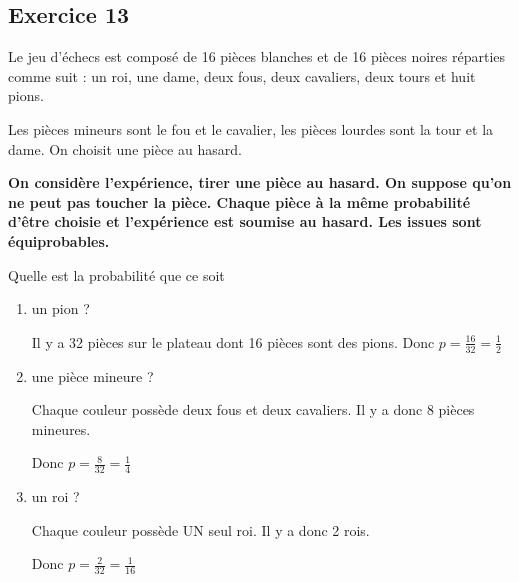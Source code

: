 \documentclass[openany]{book}
\begin{document}
\newpage

\begin{minipage}{0.5\linewidth}
 
\subsection{Exercice 13}
 
Le jeu d'échecs est composé de 16 pièces blanches et de 16 pièces noires réparties comme suit : un roi, une dame, deux fous, deux cavaliers, deux tours et huit pions.

Les pièces mineurs sont le fou et le cavalier, les pièces lourdes sont la tour et la dame. On choisit une pièce au hasard.


\textbf{On considère l'expérience, tirer une pièce au hasard. On suppose qu'on ne peut pas toucher la pièce. Chaque pièce à la même probabilité d'être choisie et l'expérience est soumise au hasard. Les issues sont équiprobables.}  

Quelle est la probabilité que ce soit
\begin{enumerate}
\item un pion ?

Il y a 32 pièces sur le plateau dont 16 pièces sont des pions. Donc $p = \frac{16}{32}= \frac{1}{2}$


\item une pièce mineure ?

Chaque couleur possède deux fous et deux cavaliers. Il y a donc 8 pièces mineures.

Donc $p = \frac{8}{32}= \frac{1}{4}$

\item un roi ?

Chaque couleur possède UN seul roi. Il y a donc 2 rois.

Donc $p = \frac{2}{32}= \frac{1}{16}$

\end{enumerate} 
 
 
\end{minipage}


\newpage
\end{document}
